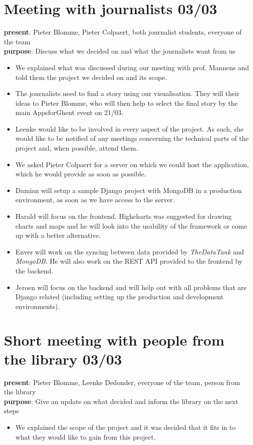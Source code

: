 \section{Meeting with journalists 03/03}
{\bf present}: Pieter Blomme, Pieter Colpaert, both journalist students, everyone of the team\\
{\bf purpose}: Discuss what we decided on and what the journalists want from us\\
\begin{itemize}
  \item We explained what was discussed during our meeting with prof. Mannens and told them the project we decided on and its scope.
  \item The journalists need to find a story using our visualisation. They will their ideas to Pieter Blomme, who will then help to select the final story by the main AppsforGhent event on 21/03.
  \item Leenke would like to be involved in every aspect of the project. As such, she would like to be notified of any meetings concerning the technical parts of the project and, when possible, attend them.
  \item We asked Pieter Colpaert for a server on which we could host the application, which he would provide as soon as possible.
  \item Damian will setup a sample Django project with MongoDB in a production environment, as soon as we have access to the server.
  \item Harald will focus on the frontend. Highcharts was suggested for drawing charts and maps and he will look into the usability of the framework or come up with a better alternative.
  \item Enver will work on the syncing between data provided by \emph{TheDataTank} and \emph{MongoDB}. He will also work on the REST API provided to the frontend by the backend.
  \item Jeroen will focus on the backend and will help out with all problems that are Django related (including setting up the production and development environments).
\end{itemize}

\section{Short meeting with people from the library 03/03}
{\bf present}: Pieter Blomme, Leenke Dedonder, everyone of the team, person from the library\\
{\bf purpose}: Give an update on what decided and inform the library on the next steps\\
\begin{itemize}
  \item We explained the scope of the project and it was decided that it fits in to what they would like to gain from this project.
\end{itemize}